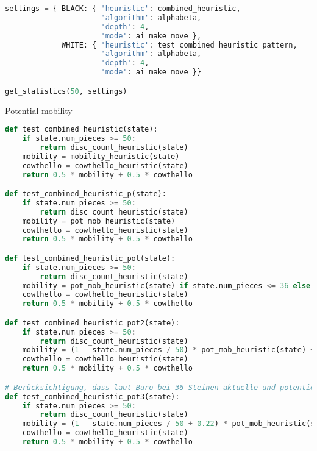 \begin{lstlisting}[language=Python]
settings = { BLACK: { 'heuristic': combined_heuristic,
                      'algorithm': alphabeta,
                      'depth': 4,
                      'mode': ai_make_move },
             WHITE: { 'heuristic': test_combined_heuristic_pattern,
                      'algorithm': alphabeta,
                      'depth': 4,
                      'mode': ai_make_move }}

get_statistics(50, settings)
\end{lstlisting}

Potential mobility

\begin{lstlisting}[language=Python]
def test_combined_heuristic(state):
    if state.num_pieces >= 50:
        return disc_count_heuristic(state)
    mobility = mobility_heuristic(state)
    cowthello = cowthello_heuristic(state)
    return 0.5 * mobility + 0.5 * cowthello

def test_combined_heuristic_p(state):
    if state.num_pieces >= 50:
        return disc_count_heuristic(state)
    mobility = pot_mob_heuristic(state)
    cowthello = cowthello_heuristic(state)
    return 0.5 * mobility + 0.5 * cowthello

def test_combined_heuristic_pot(state):
    if state.num_pieces >= 50:
        return disc_count_heuristic(state)
    mobility = pot_mob_heuristic(state) if state.num_pieces <= 36 else mobility_heuristic(state)
    cowthello = cowthello_heuristic(state)
    return 0.5 * mobility + 0.5 * cowthello

def test_combined_heuristic_pot2(state):
    if state.num_pieces >= 50:
        return disc_count_heuristic(state)
    mobility = (1 - state.num_pieces / 50) * pot_mob_heuristic(state) + (state.num_pieces / 50) *  mobility_heuristic(state)
    cowthello = cowthello_heuristic(state)
    return 0.5 * mobility + 0.5 * cowthello

# Berücksichtigung, dass laut Buro bei 36 Steinen aktuelle und potentielle Mobilität gleich gut sind, vorrausgesetzt die Mobilitäten haben die gleiche Größenordnung
def test_combined_heuristic_pot3(state):
    if state.num_pieces >= 50:
        return disc_count_heuristic(state)
    mobility = (1 - state.num_pieces / 50 + 0.22) * pot_mob_heuristic(state) + (state.num_pieces / 50 - 0.22) *  mobility_heuristic(state)
    cowthello = cowthello_heuristic(state)
    return 0.5 * mobility + 0.5 * cowthello
\end{lstlisting}

